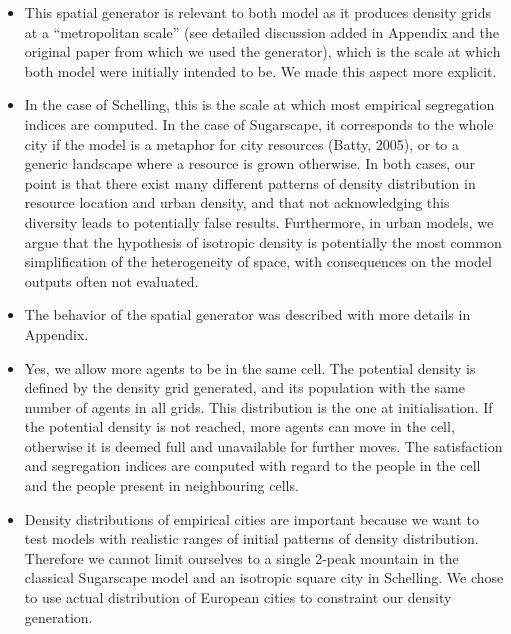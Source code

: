 \documentclass[11pt,a4paper,sans]{moderncv}        %
\begin{document}
\begin{itemize}
	\item This spatial generator is relevant to both model as it produces density grids at a ``metropolitan scale'' (see detailed discussion added in Appendix and the original paper from which we used the generator), which is the scale at which both model were initially intended to be. We made this aspect more explicit. 
	
	\item In the case of Schelling, this is the scale at which most empirical segregation indices are computed. In the case of Sugarscape, it corresponds to the whole city if the model is a metaphor for city resources (Batty, 2005), or to a generic landscape where a resource is grown otherwise. In both cases, our point is that there exist many different patterns of density distribution in resource location and urban density, and that not acknowledging this diversity leads to potentially false results. Furthermore, in urban models, we argue that the hypothesis of isotropic density is potentially the most common simplification of the heterogeneity of space, with consequences on the model outputs often not evaluated.
	
	\item The behavior of the spatial generator was described with more details in Appendix.
	
	\item Yes, we allow more agents to be in the same cell. The potential density is defined by the density grid generated, and its population with the same number of agents in all grids. This distribution is the one at initialisation. If the potential density is not reached, more agents can move in the cell, otherwise it is deemed full and unavailable for further moves. The satisfaction and segregation indices are computed with regard to the people in the cell and the people present in neighbouring cells.
	
	\item Density distributions of empirical cities are important because we want to test models with realistic ranges of initial patterns of density distribution. Therefore we cannot limit ourselves to a single 2-peak mountain in the classical Sugarscape model and an isotropic square city in Schelling. We chose to use actual distribution of European cities to constraint our density generation.
	

\end{itemize}
\end{document}
